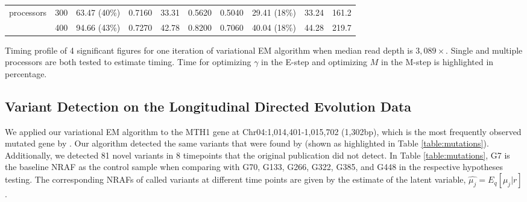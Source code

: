 \documentclass{bmcart}
\begin{document}
\begin{table}[htbp]
\begin{threeparttable}
\begin{tabular}{ccrrrrrrcc}
    processors & 300   & \multicolumn{1}{c}{63.47 (40\%)} & \multicolumn{1}{c}{0.7160} & \multicolumn{1}{c}{33.31} & \multicolumn{1}{c}{0.5620} & \multicolumn{1}{c}{0.5040} & \multicolumn{1}{c}{29.41 (18\%)} & 33.24 & 161.2 \\
          & 400   & \multicolumn{1}{c}{94.66 (43\%)} & \multicolumn{1}{c}{0.7270} & \multicolumn{1}{c}{42.78} & \multicolumn{1}{c}{0.8200} & \multicolumn{1}{c}{0.7060} & \multicolumn{1}{c}{40.04 (18\%)} & 44.28 & 219.7 \\
    \bottomrule
    \end{tabular}%
    \begin{tablenotes}
    \item Timing profile of 4 significant figures for one iteration of variational EM algorithm when median read depth is $3,089\times$.
Single and multiple processors are both tested to estimate timing. Time for optimizing $\gamma$ in the E-step and optimizing $M$ in the M-step is highlighted in percentage.
    \end{tablenotes}
    \end{threeparttable}
\end{table}%



\subsection*{Variant Detection on the Longitudinal Directed Evolution Data}
We applied our variational EM algorithm to the MTH1 gene at Chr04:1,014,401-1,015,702 (1,302bp), which is the most frequently observed mutated gene by \cite{kvitek2013whole}.
Our algorithm detected the same variants that were found by \cite{kvitek2013whole} (shown as highlighted in Table \ref{table:mutations}).
Additionally, we detected 81 novel variants in 8 timepoints that the original publication did not detect.
In Table \ref{table:mutations}, G7 is the baseline NRAF as the control sample when comparing with G70, G133, G266, G322, G385, and G448 in the respective hypotheses testing.
The corresponding NRAFs of called variants at different time points are given by the estimate of the latent variable, $\hat{\mu_j} = E_q[\mu_j|r]$.
\end{document}
